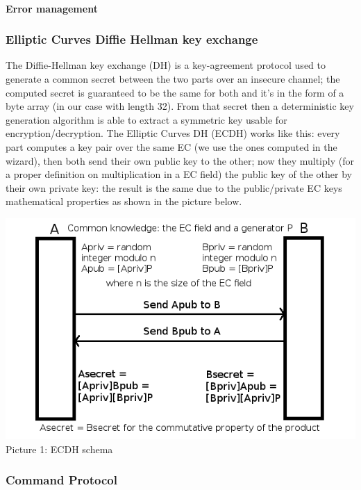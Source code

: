 \documentclass[a4paper,12pt]{article}
\begin{document}
\paragraph{Error management}
\subsubsection{Elliptic Curves Diffie Hellman key exchange}
The Diffie-Hellman key exchange (DH) is a key-agreement protocol used to generate a common secret between the two parts over an insecure channel; the computed secret is guaranteed to be the same for both and it's in the form of a byte array (in our case with length 32). From that secret then a deterministic key generation algorithm is able to extract a symmetric key usable for encryption/decryption. The Elliptic Curves DH (ECDH) works like this: every part computes a key pair over the same EC (we use the ones computed in the wizard), then both send their own public key to the other; now they multiply (for a proper definition on multiplication in a EC field) the public key of the other by their own private key: the result is the same due to the public/private EC keys mathematical properties as shown in the picture below.\\

\vspace{1cm}
\begin{center}
\includegraphics[scale=0.7]{images/ecdh}\\

\vspace{1cm}
Picture 1: ECDH schema\\
\end{center}
\clearpage
\subsubsection{Command Protocol}
\end{document}
